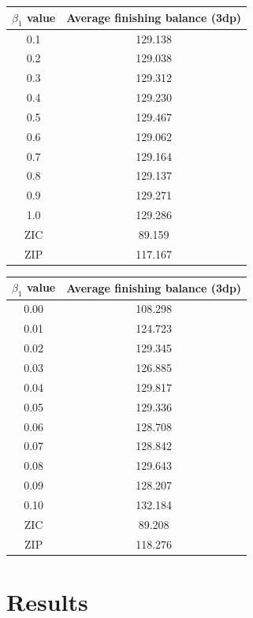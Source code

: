 \documentclass{acm_proc_article-sp}
\begin{document}
\begin{table}
  \centering
  \label{tbl:beta1_results_big}
  \begin{tabular}{ | c | c | }
    \hline
    \textbf{$\beta_1$ value} & \textbf{Average finishing balance (3dp)} \\
    \hline
    0.1 & 129.138 \\
    0.2 & 129.038 \\
    0.3 & 129.312 \\
    0.4 & 129.230 \\
    0.5 & 129.467 \\
    0.6 & 129.062 \\
    0.7 & 129.164 \\
    0.8 & 129.137 \\
    0.9 & 129.271 \\
    1.0 & 129.286 \\
    \hline \hline
    ZIC & 89.159 \\
    ZIP & 117.167 \\
    \hline
  \end{tabular}
\end{table}

\begin{table}
  \centering
  \label{tbl:beta1_results_small}
  \begin{tabular}{ | c | c | }
    \hline
    \textbf{$\beta_1$ value} & \textbf{Average finishing balance (3dp)} \\
    \hline
    0.00 & 108.298 \\
    0.01 & 124.723 \\
    0.02 & 129.345 \\
    0.03 & 126.885 \\
    0.04 & 129.817 \\
    0.05 & 129.336 \\
    0.06 & 128.708 \\
    0.07 & 128.842 \\
    0.08 & 129.643 \\
    0.09 & 128.207 \\
    0.10 & 132.184 \\
    \hline \hline
    ZIC & 89.208 \\
    ZIP & 118.276 \\
    \hline
  \end{tabular}
\end{table}


\section{Results} \label{sec:results}
\end{document}
